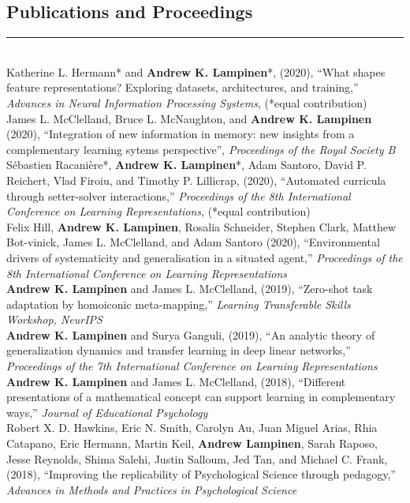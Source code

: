\documentclass[margin]{res}
\begin{document}
\begin{resume}
\vspace{1pt}\section{Publications and Proceedings} \vspace{-15pt} \rule{\textwidth}{0.5pt} \\[3pt]
Katherine L. Hermann* and \textbf{Andrew K. Lampinen}*, (2020), {``What shapes feature representations? Exploring datasets, architectures, and training,''} \textit{Advances in Neural Information Processing Systems}, (*equal contribution) \\[3pt] 
James L. McClelland, Bruce L. McNaughton, and \textbf{Andrew K. Lampinen} (2020), {``Integration of new information in memory: new insights from a complementary learning sytems perspective''}, \textit{Proceedings of the Royal Society B} \\[3pt]
S\'ebastien Racani\`ere*, \textbf{Andrew K. Lampinen}*, Adam Santoro, David P. Reichert, Vlad Firoiu, and Timothy P. Lillicrap, (2020), {``Automated curricula through setter-solver interactions,''} \textit{Proceedings of the 8th International Conference on Learning Representations}, (*equal contribution) \\ [3pt] 
Felix Hill, \textbf{Andrew K. Lampinen}, Rosalia Schneider, Stephen Clark, Matthew Bot-vinick, James L. McClelland, and Adam Santoro (2020), {``Environmental drivers of systematicity and generalisation in a situated agent,''} \textit{Proceedings of the 8th International Conference on Learning Representations} \\ [3pt] 
\textbf{Andrew K. Lampinen} and James L. McClelland, (2019), {``Zero-shot task adaptation by homoiconic meta-mapping,''} \textit{Learning Transferable Skills Workshop, NeurIPS} \\ [3pt] 
\textbf{Andrew K. Lampinen} and Surya Ganguli, (2019), {``An analytic theory of generalization dynamics and transfer learning in deep linear networks,''} \textit{Proceedings of the 7th International Conference on Learning Representations} \\[3pt] 
\textbf{Andrew K. Lampinen} and James L. McClelland, (2018), {``Different presentations of a mathematical concept can support learning in complementary ways,''} \textit{Journal of Educational Psychology} \\[3pt]
 Robert X. D. Hawkins, Eric N. Smith, Carolyn Au, Juan Miguel Arias, Rhia Catapano, Eric Hermann, Martin Keil, \textbf{Andrew Lampinen}, Sarah Raposo, Jesse Reynolds, Shima Salehi, Justin Salloum, Jed Tan, and Michael C. Frank, (2018), {``Improving the replicability of Psychological Science through pedagogy,''}  \textit{Advances in Methods and Practices in Psychological Science} \\ [3pt]

\end{resume}
\end{document}
